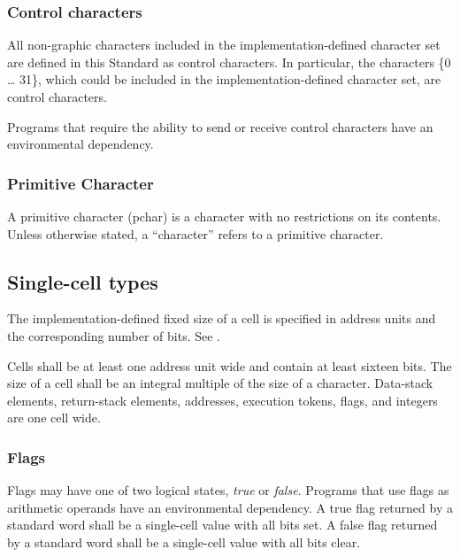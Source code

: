 \subsubsection{Control characters} %
\label{usage:control}

All non-graphic characters included in the implementation-defined
character set are defined in this Standard as control characters.
In particular, the characters \{0 {\ldots} 31\}, which could be
included in the im\-ple\-ment\-ation-de\-fined character set, are control
characters.

Programs that require the ability to send or receive control
characters have an environmental dependency.

\subsubsection{Primitive Character} %
\label{usage:pchar}

A primitive character (pchar) is a character with no restrictions on
its contents.  Unless otherwise stated, a ``character'' refers to a
primitive character.

\subsection{Single-cell types} %
\label{usage:cell}

The implementation-defined fixed size of a cell is specified in
address units and the corresponding number of bits.
See .

Cells shall be at least one address unit wide and contain at least
sixteen bits. The size of a cell shall be an integral multiple of
the size of a character. Data-stack elements, return-stack elements,
addresses, execution tokens, flags, and integers are one cell wide.

\subsubsection{Flags} %
\label{usage:flags}

Flags may have one of two logical states, \emph{true} or \emph{false}.
Programs that use flags as arithmetic operands have an environmental
dependency. A true flag returned by a standard word shall be a
single-cell value with all bits set. A false flag returned by a
standard word shall be a single-cell value with all bits clear.

